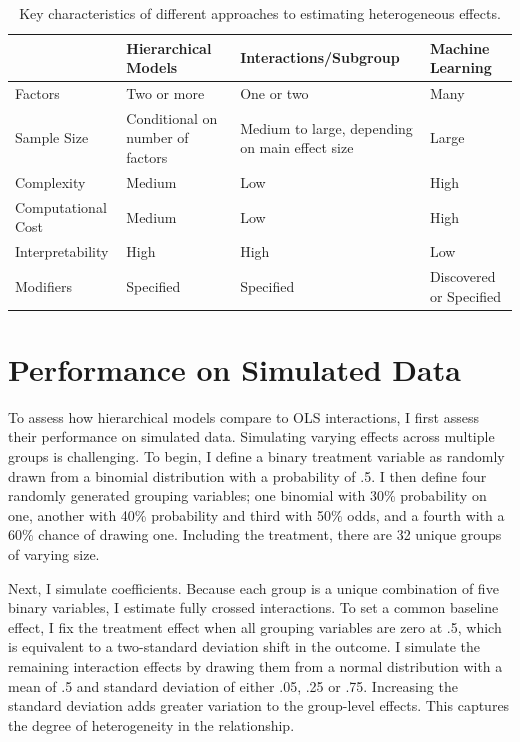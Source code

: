 \documentclass[12pt]{article}
\begin{document}
\begin{table}
\begin{tabular}{|p{1in}|p{1.5in}|p{1.5in}|p{1.5in}|} \hline
                 & Hierarchical Models & Interactions/Subgroup & Machine Learning \\
\hline
Factors              & Two or more          & One or two         & Many \\ \hline
Sample Size          & Conditional on number of factors            & Medium to large, depending on main effect size    & Large \\ \hline
Complexity           & Medium             & Low                & High \\ \hline
Computational Cost   & Medium             & Low                & High \\ \hline
Interpretability     & High               & High               & Low \\ \hline
Modifiers            & Specified          & Specified      & Discovered or Specified \\
\hline
\end{tabular}
\caption{Key characteristics of different approaches to estimating heterogeneous effects.}
\label{tab:tools-det}
\end{table}


\section{Performance on Simulated Data}

To assess how hierarchical models compare to OLS interactions, I first assess their performance on simulated data. 
Simulating varying effects across multiple groups is challenging. 
To begin, I define a binary treatment variable as randomly drawn from a binomial distribution with a probability of .5.
I then define four randomly generated grouping variables; one binomial with 30\% probability on one, another with 40\% probability and third with 50\% odds, and a fourth with a 60\% chance of drawing one.
Including the treatment, there are 32 unique groups of varying size.


Next, I simulate coefficients. 
Because each group is a unique combination of five binary variables, I estimate fully crossed interactions. 
To set a common baseline effect, I fix the treatment effect when all grouping variables are zero at .5, which is equivalent to a two-standard deviation shift in the outcome.
I simulate the remaining interaction effects by drawing them from a normal distribution with a mean of .5 and standard deviation of either .05, .25 or .75. 
Increasing the standard deviation adds greater variation to the group-level effects.
This captures the degree of heterogeneity in the relationship.
\end{document}
